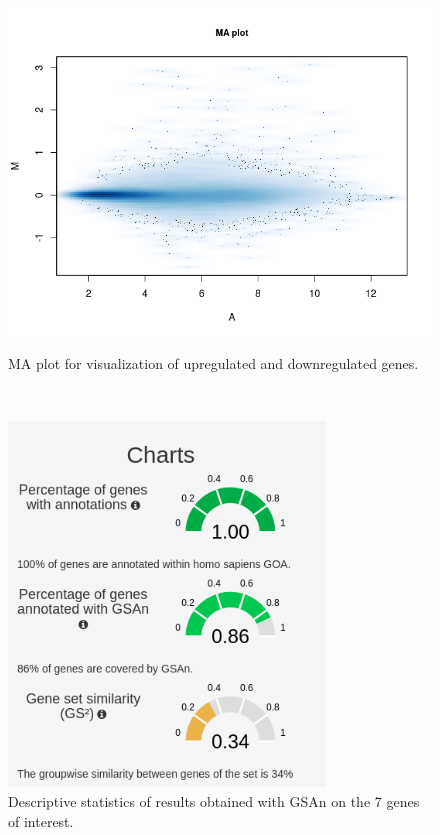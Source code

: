 \documentclass[journal, a4paper]{IEEEtran}
\begin{document}
\begin{figure}[!htp]
  \begin{center}
    \begin{minipage}{0.5 \textwidth}
      \centering
      \includegraphics[width=\textwidth]{../analysis/MA-plot-AD-paired-design.png}
      \caption{MA plot for visualization of upregulated and downregulated genes.}
      \label{fig:MA}
    \end{minipage}\\
    \begin{minipage}{0.5 \textwidth}
      \centering
      \includegraphics[width=0.75\textwidth]{gsan-charts.png}
      \caption{Descriptive statistics of results obtained with GSAn on the 7 genes of interest.}
      \label{fig:gsan-chart}
    \end{minipage}
  \end{center}
\end{figure}
\end{document}
